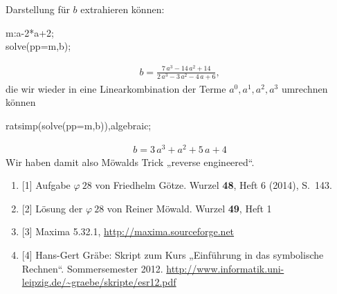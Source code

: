 \documentclass[11pt,a4paper]{article}
\begin{document}
Darstellung für $b$ extrahieren können:
\begin{code}
  m:a-2*a+2;\\
  solve(pp=m,b);
\end{code}
\begin{gather*}
  b = \frac{7\,a^3-14\,a^2+14}{2\,a^3-3\,a^2-4\,a+6},
\end{gather*}
die wir wieder in eine Linearkombination der Terme $a^0,a^1,a^2,a^3$ umrechnen
können
\begin{code}
  ratsimp(solve(pp=m,b)),algebraic;
\end{code}
\begin{gather*}
  b = 3\,a^3+a^2+5\,a+4
\end{gather*}
Wir haben damit also Möwalds Trick „reverse engineered“.

\begin{enumerate}
\item{[1]} Aufgabe $\varphi\ 28$ von Friedhelm Götze. Wurzel {\bf 48}, Heft 6
  (2014), S.\ 143.
\item{[2]} Lösung der $\varphi\ 28$ von Reiner Möwald. Wurzel {\bf 49}, Heft 1
\item{[3]} Maxima 5.32.1, \url{http://maxima.sourceforge.net}
\item{[4]} Hans-Gert Gräbe: Skript zum Kurs „Einführung in das symbolische
  Rechnen“.  Sommersemester 2012.
  \url{http://www.informatik.uni-leipzig.de/~graebe/skripte/esr12.pdf}
\end{enumerate}
\end{document}
